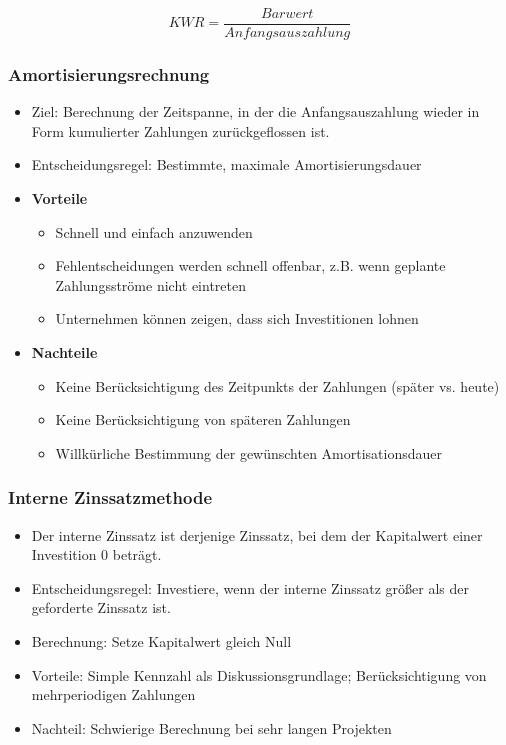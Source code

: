 \[KWR = \frac{Barwert}{Anfangsauszahlung}\]

\subsubsection{Amortisierungsrechnung}
\begin{itemize}
	\item Ziel: Berechnung der Zeitspanne, in der die Anfangsauszahlung wieder in Form kumulierter Zahlungen zurückgeflossen ist.
	\item Entscheidungsregel: Bestimmte, maximale Amortisierungsdauer
	\item \textbf{Vorteile}
	\begin{itemize}
		\item Schnell und einfach anzuwenden
		\item Fehlentscheidungen werden schnell offenbar, z.B. wenn geplante Zahlungsströme nicht eintreten
		\item Unternehmen können zeigen, dass sich Investitionen lohnen
	\end{itemize}
	\item \textbf{Nachteile}
	\begin{itemize}
		\item Keine Berücksichtigung des Zeitpunkts der Zahlungen (später vs. heute)
		\item Keine Berücksichtigung von späteren Zahlungen
		\item Willkürliche Bestimmung der gewünschten Amortisationsdauer
	\end{itemize}
\end{itemize}

\subsubsection{Interne Zinssatzmethode}
\begin{itemize}
	\item Der interne Zinssatz ist derjenige Zinssatz, bei dem der Kapitalwert einer Investition 0 beträgt.
	\item Entscheidungsregel: Investiere, wenn der interne Zinssatz größer als der geforderte Zinssatz ist.
	\item Berechnung: Setze Kapitalwert gleich Null
	\item Vorteile: Simple Kennzahl als Diskussionsgrundlage; Berücksichtigung von mehrperiodigen Zahlungen
	\item Nachteil: Schwierige Berechnung bei sehr langen Projekten
\end{itemize}



